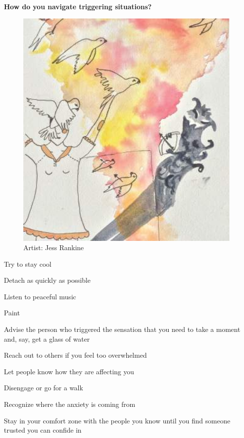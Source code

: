 \newpage
\noindent\textcolor{ProcessBlue}{\textbf{\Large{How do you navigate triggering situations?}}}\\
\begin{figure}[h]
\centering
\includegraphics[width=17cm]{TeX_files/3-3.png}
\caption{Artist: Jess Rankine}
\label{3-3}
\end{figure}

\begin{checkboxlist}
\item Try to stay cool
\item Detach as quickly as possible
\item Listen to peaceful music
\item Paint
\item Advise the person who triggered the sensation that you need to take a moment and, say, get a glass of water
\item Reach out to others if you feel too overwhelmed
\item Let people know how they are affecting you
\item Disengage or go for a walk
\item Recognize where the anxiety is coming from
\item Stay in your comfort zone with the people you know until you find someone trusted you can confide in
\end{checkboxlist}

